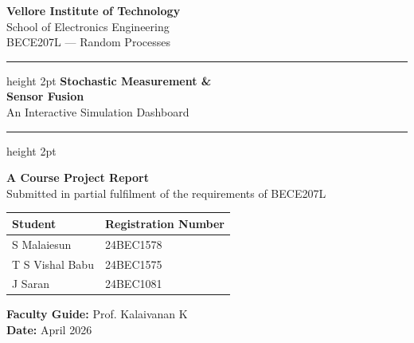 \documentclass[12pt, a4paper]{article}
\begin{document}
\begin{titlepage}
  \centering
  \vspace*{1cm}

  {\Large\bfseries Vellore Institute of Technology}\\[0.3cm]
  {\large School of Electronics Engineering}\\[0.3cm]
  {\large BECE207L --- Random Processes}\\[2cm]

  \hrule height 2pt
  \vspace{0.6cm}
  {\Huge\bfseries\color{primary} Stochastic Measurement \&\\[0.4cm] Sensor Fusion}\\[0.4cm]
  {\LARGE\color{accent} An Interactive Simulation Dashboard}
  \vspace{0.6cm}
  \hrule height 2pt

  \vspace{1.5cm}
  {\large\bfseries A Course Project Report}\\[0.3cm]
  {\normalsize Submitted in partial fulfilment of the requirements of BECE207L}

  \vfill

  \begin{tabular}{ll}
    \toprule
    \textbf{Student} & \textbf{Registration Number} \\
    \midrule
    S Malaiesun     & 24BEC1578 \\
    T S Vishal Babu & 24BEC1575 \\
    J Saran         & 24BEC1081 \\
    \bottomrule
  \end{tabular}

  \vspace{1cm}
  {\normalsize\textbf{Faculty Guide:} Prof. Kalaivanan K}\\[0.3cm]
  {\normalsize\textbf{Date:} April 2026}
\end{titlepage}

\tableofcontents
\newpage
\onehalfspacing
\end{document}
